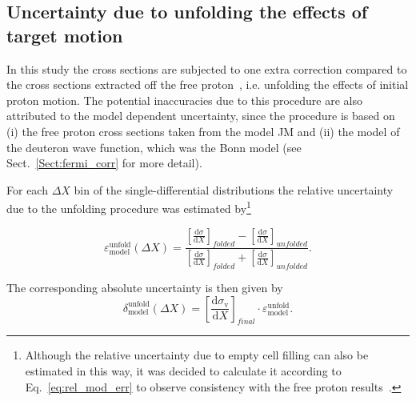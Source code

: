 \subsection{Uncertainty due to unfolding the effects of target motion}
\label{Sect:mod_dep2}

In this study the cross sections are subjected to one extra correction compared to the cross sections extracted off the free proton~\cite{Rip_an_note:2002,Ripani:2002ss,Fed_an_note:2007,Fedotov:2008aa,Isupov:2017lnd,Arjun,Fed_an_note:2017,Fed_paper_2018}, i.e. unfolding the effects of initial proton motion. The potential inaccuracies due to this procedure are also attributed to the model dependent uncertainty, since the procedure is based on (i) the free proton cross sections taken from the model JM and (ii) the model of the deuteron wave function, which was the Bonn model (see Sect.~\ref{Sect:fermi_corr} for more detail). 

For each $\Delta X$ bin of the single-differential distributions the relative uncertainty due to the unfolding procedure was estimated by\footnote[5]{Although the relative uncertainty due to empty cell filling can also be estimated in this way, it was decided to calculate it according to Eq.~\eqref{eq:rel_mod_err} to observe consistency with the free proton results~\cite{Fed_an_note:2017}.}

\begin{equation}
\varepsilon^{\text{unfold}}_{\text{model}} (\Delta X) = \dfrac{\left [ \frac{\textrm{d}\sigma}{\textrm{d}X} \right ]_{folded} - \left [ \frac{\textrm{d}\sigma}{\textrm{d}X} \right ]_{unfolded}}{\left [ \frac{\textrm{d}\sigma}{\textrm{d}X} \right ]_{folded} + \left [ \frac{\textrm{d}\sigma}{\textrm{d}X} \right ]_{unfolded}}.
\label{eq:rel_mod_err_fermi}
\end{equation}

The corresponding absolute uncertainty is then given by
\begin{equation}
\delta^{\text{unfold}}_{\text{model}} (\Delta X) = \left [ \frac{\textrm{d}\sigma_{\text{v}}}{\textrm{d}X} \right ]_{final}\!\! \cdot \varepsilon^{\text{unfold}}_{\text{model}}.
\label{eq:error_stat_mod_fermi}
\end{equation}



